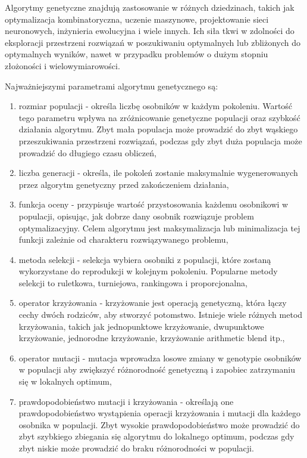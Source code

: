 \documentclass[12pt,twoside]{article}
\begin{document}
Algorytmy genetyczne znajdują zastosowanie w różnych dziedzinach, takich jak optymalizacja kombinatoryczna, uczenie maszynowe, projektowanie sieci neuronowych, inżynieria ewolucyjna i wiele innych. Ich siła tkwi w zdolności do eksploracji przestrzeni rozwiązań w poszukiwaniu optymalnych lub zbliżonych do optymalnych wyników, nawet w przypadku problemów o dużym stopniu złożoności i wielowymiarowości.

Najważniejszymi parametrami algorytmu genetycznego są:
\begin{enumerate}[label=\alph*), leftmargin=1.25cm]
	\item rozmiar populacji - określa liczbę osobników w każdym pokoleniu. Wartość tego parametru wpływa na zróżnicowanie genetyczne populacji oraz szybkość działania algorytmu. Zbyt mała populacja może prowadzić do zbyt wąskiego przeszukiwania przestrzeni rozwiązań, podczas gdy zbyt duża populacja może prowadzić do długiego czasu obliczeń,
	
	\item liczba generacji - określa, ile pokoleń zostanie maksymalnie wygenerowanych przez algorytm genetyczny przed zakończeniem działania,
	
	\item funkcja oceny - przypisuje wartość przystosowania każdemu osobnikowi w populacji, opisując, jak dobrze dany osobnik rozwiązuje problem optymalizacyjny. Celem algorytmu jest maksymalizacja lub minimalizacja tej funkcji zależnie od charakteru rozwiązywanego problemu,
	
	\item metoda selekcji - selekcja wybiera osobniki z populacji, które zostaną wykorzystane do reprodukcji w kolejnym pokoleniu. Popularne metody selekcji to ruletkowa, turniejowa, rankingowa i proporcjonalna,
	
	\item operator krzyżowania - krzyżowanie jest operacją genetyczną, która łączy cechy dwóch rodziców, aby stworzyć potomstwo. Istnieje wiele różnych metod krzyżowania, takich jak jednopunktowe krzyżowanie, dwupunktowe krzyżowanie, jednorodne krzyżowanie, krzyżowanie arithmetic blend itp.,
	
	\item operator mutacji - mutacja wprowadza losowe zmiany w genotypie osobników w populacji aby zwiększyć różnorodność genetyczną i zapobiec zatrzymaniu się w lokalnych optimum,
	
	\item prawdopodobieństwo mutacji i krzyżowania - określają one prawdopodobieństwo wystąpienia operacji krzyżowania i mutacji dla każdego osobnika w populacji. Zbyt wysokie prawdopodobieństwo może prowadzić do zbyt szybkiego zbiegania się algorytmu do lokalnego optimum, podczas gdy zbyt niskie może prowadzić do braku różnorodności w populacji.
	
\end{enumerate}
\end{document}
